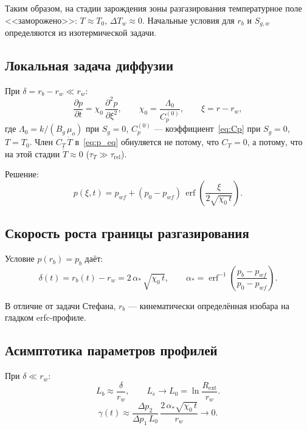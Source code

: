 \documentclass[12pt,a4paper]{article}
\newcommand{\pp}{\partial}
\newcommand{\ext}{\mathrm{ext}}
\begin{document}
Таким образом, на стадии зарождения зоны разгазирования
температурное поле <<заморожено>>: $T \approx T_0$,
$\Delta T_w \approx 0$. Начальные условия для $r_b$
и $S_{g,w}$ определяются из изотермической задачи.

\subsection{Локальная задача диффузии}

При $\delta = r_b - r_w \ll r_w$:
\begin{equation}\label{eq:diffusion}
  \frac{\pp p}{\pp t} = \chi_0\,\frac{\pp^2 p}{\pp \xi^2},
  \qquad
  \chi_0 = \frac{\Lambda_0}{C_p^{(0)}},
  \qquad
  \xi = r - r_w,
\end{equation}
где $\Lambda_0 = k/(B_g\,\mu_o)$ при $S_g = 0$,
$C_p^{(0)}$ --- коэффициент~\eqref{eq:Cp}
при $S_g = 0$, $T = T_0$.
Член $C_T\,\dot{T}$ в~\eqref{eq:p_eq} обнуляется не потому,
что $C_T = 0$, а потому, что на этой стадии $\dot{T} \approx 0$
($\tau_T \gg \tau_\mathrm{rel}$).

Решение:
\begin{equation}\label{eq:p_erfc}
  p(\xi, t) = p_{wf} + (p_0 - p_{wf})\,
    \operatorname{erf}\!\left(\frac{\xi}{2\sqrt{\chi_0\,t}}\right).
\end{equation}

\subsection{Скорость роста границы разгазирования}

Условие $p(r_b) = p_b$ даёт:
\begin{equation}\label{eq:delta_sqrt}
  \boxed{
    \delta(t) = r_b(t) - r_w = 2\,\alpha_*\,\sqrt{\chi_0\,t},
    \qquad
    \alpha_* = \operatorname{erf}^{-1}\!\left(
      \frac{p_b - p_{wf}}{p_0 - p_{wf}}
    \right).
  }
\end{equation}

В отличие от задачи Стефана, $r_b$ --- кинематически
определённая изобара на гладком erfc-профиле.

\subsection{Асимптотика параметров профилей}

При $\delta \ll r_w$:
\begin{equation}\label{eq:Lb_asymp}
  L_b \approx \frac{\delta}{r_w},
  \qquad
  L_e \to L_0 = \ln\!\frac{R_\ext}{r_w}.
\end{equation}
\begin{equation}\label{eq:gamma_asymp}
  \gamma(t)
  \approx \frac{\Delta p_2}{\Delta p_1\,L_0}\,
    \frac{2\,\alpha_*\sqrt{\chi_0\,t}}{r_w} \to 0.
\end{equation}
\end{document}
